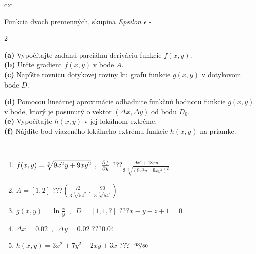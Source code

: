 \documentclass[10pt]{report}
\begin{document}
\begin{tabular}{c:c}
\begin{minipage}[c][104.5mm][t]{0.5\linewidth}
\begin{center}
\vspace{7mm}
{\huge \LARGE Funkcia dvoch premenných, skupina \textit{Epsilon $\epsilon$} -}\\[5mm]
\begin{minipage}{0.95\linewidth}
\begin{center}
{\small \begin{multicols}{2} \raggedright
\textbf{(a)} Vypočítajte zadanú parciálnu deriváciu funkcie \(f(x,y)\). \\[1mm]
\textbf{(b)} Určte gradient \(f(x,y)\) v bode \(A\). \\[1mm]
\textbf{(c)} Napíšte rovnicu dotykovej roviny ku grafu funkcie \(g(x,y)\) v dotykovom bode \(D\). \par \columnbreak
\textbf{(d)} Pomocou lineárnej aproximácie odhadnite funkčnú hodnotu funkcie \(g(x,y)\) v bode, ktorý je posunutý o vektor \((\Delta x, \Delta y)\) od bodu \(D_0\). \\[1mm]
\textbf{(e)} Vypočítajte \(h(x,y)\) v jej lokálnom extréme. \\[1mm]
\textbf{(f)} Nájdite bod viazeného lokálneho extrému funkcie \(h(x,y)\) na priamke. \\[1mm]
\end{multicols}
}
\end{center}
\end{minipage}
\\[4mm]
\begin{minipage}{0.79\linewidth}
\begin{center}
\begin{varwidth}{\linewidth}
\begin{enumerate}
\normalsizerr
\item $f(x,y) = \sqrt[3]{9x^2y + 9xy^2}\enspace , \enspace \pdv{f}{y}$\quad \dotfill\; ???\;\dotfill \quad $\frac{9x^2+18xy}{3\,\sqrt[3]{(9x^2y+9xy^2)^{2}}}$
\item $A = [1, 2]$\quad \dotfill\; ???\;\dotfill \quad $\left( \frac{72}{3\,\sqrt[3]{54^2}} \;,\; \frac{90}{3\,\sqrt[3]{54^2}} \right)$
\item $g(x,y) = \ln\frac{x}{y} \enspace , \enspace D=[1,1,?]$\quad \dotfill\; ???\;\dotfill \quad $x - y - z + 1 = 0$
\item $\Delta x = {0.02} \enspace,\enspace \Delta y = {0.02}$\quad \dotfill\; ???\;\dotfill \quad $0.04$
\item $h(x,y) = 3x^2+7y^2-2xy+3x$\quad \dotfill\; ???\;\dotfill \quad $\nicefrac{-63}{80}$

\end{enumerate}
\end{varwidth}
\end{center}
\end{minipage}
\end{center}
\end{minipage}
\end{tabular}
\end{document}
